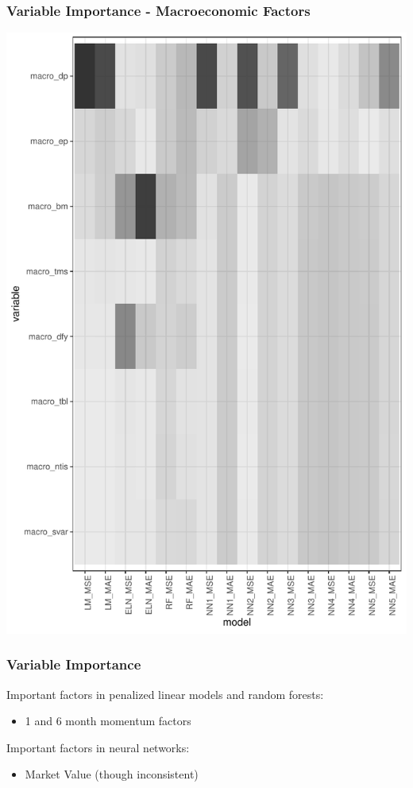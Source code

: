 \documentclass[aspectratio=169]{beamer}
\begin{document}
\begin{frame}
\frametitle{Variable Importance - Macroeconomic Factors}
\includegraphics{empirical_sample_all_vi_macro.pdf}
\end{frame}

\begin{frame}
\frametitle{Variable Importance}
Important factors in penalized linear models and random forests:
\begin{itemize}
\item 1 and 6 month momentum factors
\end{itemize}
Important factors in neural networks:
\begin{itemize}
\item Market Value (though inconsistent)
\end{itemize}
\end{frame}
\end{document}
